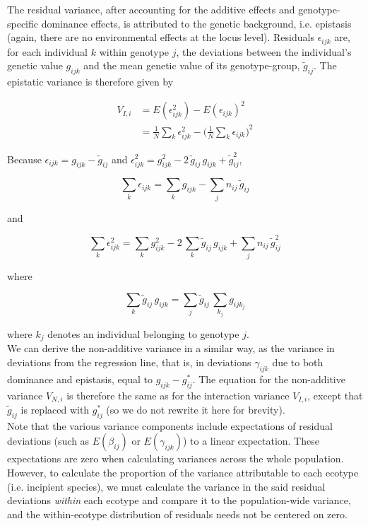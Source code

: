 \documentclass[]{article}
\begin{document}
The residual variance, after accounting for the additive effects and genotype-specific dominance effects, is attributed to the genetic background, i.e. epistasis (again, there are no environmental effects at the locus level). Residuals $\epsilon_{ijk}$ are, for each individual $k$ within genotype $j$, the deviations between the individual's genetic value $g_{ijk}$ and the mean genetic value of its genotype-group, $\tilde{g}_{ij}$. The epistatic variance is therefore given by

\begin{align} 
V_{I,i} &= E(\epsilon_{ijk}^2) - E(\epsilon_{ijk})^2\\
&= \frac{1}{N} \sum_k \epsilon_{ijk}^2 - \bigg( \frac{1}{N} \sum_k \epsilon_{ijk} \bigg)^2
\end{align}

Because $\epsilon_{ijk} = g_{ijk} - \tilde{g}_{ij}$ and $\epsilon_{ijk}^2 = g_{ijk}^2 - 2 \, \tilde{g}_{ij} \, g_{ijk} + \tilde{g}_{ij}^2$, 

\begin{equation}
\sum_k \epsilon_{ijk} = \sum_k g_{ijk} - \sum_j n_{ij} \, \tilde{g}_{ij}
\end{equation}

and

\begin{equation}
\sum_k \epsilon_{ijk}^2 = \sum_k g_{ijk}^2 - 2 \, \sum_k \tilde{g}_{ij} \, g_{ijk} + \sum_j n_{ij} \, \tilde{g}_{ij}^2
\end{equation}

where 

\begin{equation}
\sum_k \tilde{g}_{ij} \, g_{ijk} = \sum_j \tilde{g}_{ij} \, \sum_{k_j} g_{ijk_j}
\end{equation}

where $k_j$ denotes an individual belonging to genotype $j$.\\

We can derive the non-additive variance in a similar way, as the variance in deviations from the regression line, that is, in deviations $\gamma_{ijk}$ due to both dominance and epistasis, equal to $g_{ijk} - g^*_{ij}$. The equation for the non-additive variance $V_{N,i}$ is therefore the same as for the interaction variance $V_{I,i}$, except that $\tilde{g}_{ij}$ is replaced with $g^*_{ij}$ (so we do not rewrite it here for brevity).\\

Note that the various variance components include expectations of residual deviations (such as $E(\beta_{ij})$ or $E(\gamma_{ijk})$) to a linear expectation. These expectations are zero when calculating variances across the whole population. However, to calculate the proportion of the variance attributable to each ecotype (i.e. incipient species), we must calculate the variance in the said residual deviations \textit{within} each ecotype and compare it to the population-wide variance, and the within-ecotype distribution of residuals needs not be centered on zero.\\
\end{document}

